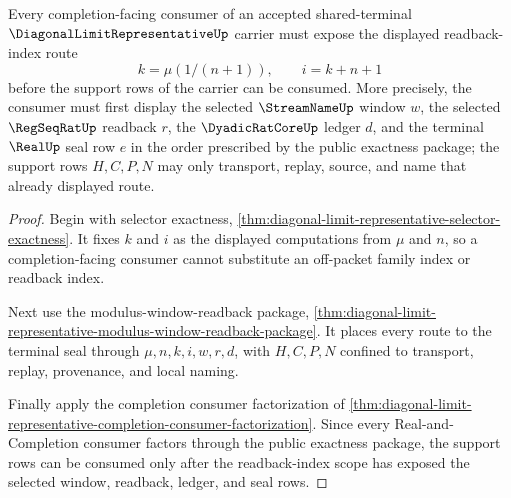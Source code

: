 \begin{theorem}
\label{thm:diagonal-limit-representative-readback-index-scope}
Every completion-facing consumer of an accepted shared-terminal $\DiagonalLimitRepresentativeUp$ carrier must expose the displayed readback-index route
$$
k=\mu(1/(n+1)),\qquad i=k+n+1
$$
before the support rows of the carrier can be consumed. More precisely, the consumer must first display the selected $\StreamNameUp$ window $w$, the selected $\RegSeqRatUp$ readback $r$, the $\DyadicRatCoreUp$ ledger $d$, and the terminal $\RealUp$ seal row $e$ in the order prescribed by the public exactness package; the support rows $H,C,P,N$ may only transport, replay, source, and name that already displayed route.
\end{theorem}
\begin{proof}
Begin with selector exactness, \autoref{thm:diagonal-limit-representative-selector-exactness}. It fixes $k$ and $i$ as the displayed computations from $\mu$ and $n$, so a completion-facing consumer cannot substitute an off-packet family index or readback index.

Next use the modulus-window-readback package, \autoref{thm:diagonal-limit-representative-modulus-window-readback-package}. It places every route to the terminal seal through $\mu,n,k,i,w,r,d$, with $H,C,P,N$ confined to transport, replay, provenance, and local naming.

Finally apply the completion consumer factorization of \autoref{thm:diagonal-limit-representative-completion-consumer-factorization}. Since every Real-and-Completion consumer factors through the public exactness package, the support rows can be consumed only after the readback-index scope has exposed the selected window, readback, ledger, and seal rows.
\end{proof}

